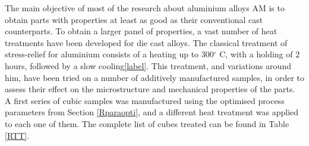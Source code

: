 
The main objective of most of the research about aluminium alloys AM is to obtain parts with properties at least as good as their conventional cast counterparts. To obtain a larger panel of properties, a vast number of heat treatments have been developed for die cast alloys. The classical treatment of stress-relief for aluminium consists of a heating up to 300$^\circ$ C, with a holding of 2 hours, followed by a slow cooling\ref{label}. This treatment, and variations around him, have been tried on a number of additively manufactured samples, in order to assess their effect on the microstructure and mechanical properties of the parts.\\

A first series of cubic samples was manufactured using the optimised process parameters from Section \ref{Rparaopti}, and a different heat treatment was applied to each one of them. The complete list of cubes treated can be found in Table \ref{RTT}.\\

\begin{center}
\begin{table}[ht]
\noindent{} 
\caption[List of the heat-treated specimens from batch X200-180220]{List of the heat-treated specimens from batch X200-180220}
\label{tab:RTT}
\end{table}
\end{center}


